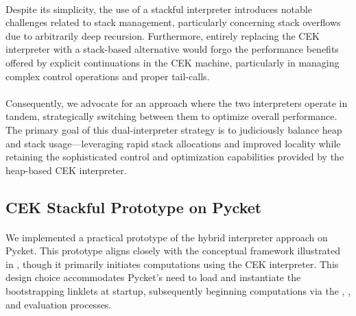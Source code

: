     \paragraph{}%
      Despite its simplicity, the use of a stackful interpreter introduces notable challenges related to stack management, particularly concerning stack overflows due to arbitrarily deep recursion. Furthermore, entirely replacing the CEK interpreter with a stack-based alternative would forgo the performance benefits offered by explicit continuations in the CEK machine, particularly in managing complex control operations and proper tail-calls.

    \paragraph{}%
      Consequently, we advocate for an approach where the two interpreters operate in tandem, strategically switching between them to optimize overall performance. The primary goal of this dual-interpreter strategy is to judiciously balance heap and stack usage—leveraging rapid stack allocations and improved locality while retaining the sophisticated control and optimization capabilities provided by the heap-based CEK interpreter.

    \subsection{CEK \+ Stackful Prototype on Pycket}

      \paragraph{}%
        We implemented a practical prototype of the hybrid interpreter approach on Pycket. This prototype aligns closely with the conceptual framework illustrated in , though it primarily initiates computations using the CEK interpreter. This design choice accommodates Pycket's need to load and instantiate the bootstrapping linklets at startup, subsequently beginning computations via the , , and evaluation processes.

